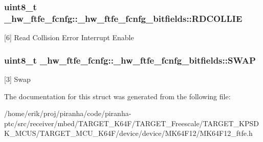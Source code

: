 \subsubsection[{\texorpdfstring{R\+D\+C\+O\+L\+L\+IE}{RDCOLLIE}}]{\setlength{\rightskip}{0pt plus 5cm}uint8\+\_\+t \+\_\+hw\+\_\+ftfe\+\_\+fcnfg\+::\+\_\+hw\+\_\+ftfe\+\_\+fcnfg\+\_\+bitfields\+::\+R\+D\+C\+O\+L\+L\+IE}\hypertarget{struct__hw__ftfe__fcnfg_1_1__hw__ftfe__fcnfg__bitfields_a86e336f400c7ca5383b474209648d36b}{}\label{struct__hw__ftfe__fcnfg_1_1__hw__ftfe__fcnfg__bitfields_a86e336f400c7ca5383b474209648d36b}
\mbox{[}6\mbox{]} Read Collision Error Interrupt Enable 
\subsubsection[{\texorpdfstring{S\+W\+AP}{SWAP}}]{\setlength{\rightskip}{0pt plus 5cm}uint8\+\_\+t \+\_\+hw\+\_\+ftfe\+\_\+fcnfg\+::\+\_\+hw\+\_\+ftfe\+\_\+fcnfg\+\_\+bitfields\+::\+S\+W\+AP}\hypertarget{struct__hw__ftfe__fcnfg_1_1__hw__ftfe__fcnfg__bitfields_ab2af7354b58035c4b90f1a65bf51e175}{}\label{struct__hw__ftfe__fcnfg_1_1__hw__ftfe__fcnfg__bitfields_ab2af7354b58035c4b90f1a65bf51e175}
\mbox{[}3\mbox{]} Swap 

The documentation for this struct was generated from the following file\+:\begin{DoxyCompactItemize}
\item 
/home/erik/proj/piranha/code/piranha-\/ptc/src/receiver/mbed/\+T\+A\+R\+G\+E\+T\+\_\+\+K64\+F/\+T\+A\+R\+G\+E\+T\+\_\+\+Freescale/\+T\+A\+R\+G\+E\+T\+\_\+\+K\+P\+S\+D\+K\+\_\+\+M\+C\+U\+S/\+T\+A\+R\+G\+E\+T\+\_\+\+M\+C\+U\+\_\+\+K64\+F/device/device/\+M\+K64\+F12/M\+K64\+F12\+\_\+ftfe.\+h\end{DoxyCompactItemize}
